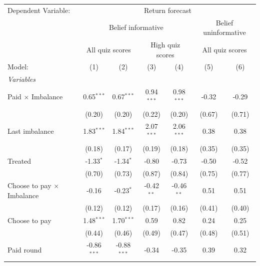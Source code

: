 \begingroup
\centering
\begin{tabular}{lcccccc}
   \tabularnewline \midrule \midrule
   Dependent Variable: & \multicolumn{6}{c}{Return forecast}\\
    & \multicolumn{4}{c}{Belief informative} & \multicolumn{2}{c}{Belief uninformative} \\ 
    & \multicolumn{2}{c}{All quiz scores} & \multicolumn{2}{c}{High quiz scores} & \multicolumn{2}{c}{All quiz scores} \\ 
   Model:                            & (1)           & (2)           & (3)           & (4)           & (5)           & (6)\\  
   \midrule
   \emph{Variables}\\
   Paid $\times$ Imbalance           & 0.65$^{***}$  & 0.67$^{***}$  & 0.94$^{***}$  & 0.98$^{***}$  & -0.32         & -0.29\\   
                                     & (0.20)        & (0.20)        & (0.22)        & (0.20)        & (0.67)        & (0.71)\\   
   Last imbalance                    & 1.83$^{***}$  & 1.84$^{***}$  & 2.07$^{***}$  & 2.06$^{***}$  & 0.38          & 0.38\\   
                                     & (0.18)        & (0.17)        & (0.19)        & (0.18)        & (0.35)        & (0.35)\\   
   Treated                           & -1.33$^{*}$   & -1.34$^{*}$   & -0.80         & -0.73         & -0.50         & -0.52\\   
                                     & (0.70)        & (0.73)        & (0.87)        & (0.84)        & (0.75)        & (0.77)\\   
   Choose to pay $\times$ Imbalance  & -0.16         & -0.23$^{*}$   & -0.42$^{**}$  & -0.46$^{**}$  & 0.51          & 0.51\\   
                                     & (0.12)        & (0.12)        & (0.17)        & (0.16)        & (0.41)        & (0.40)\\   
   Choose to pay                     & 1.48$^{***}$  & 1.70$^{***}$  & 0.59          & 0.82          & 0.24          & 0.25\\   
                                     & (0.44)        & (0.46)        & (0.49)        & (0.47)        & (0.48)        & (0.51)\\   
   Paid round                        & -0.86$^{***}$ & -0.88$^{***}$ & -0.34         & -0.35         & 0.39          & 0.32\\   

\end{tabular}
